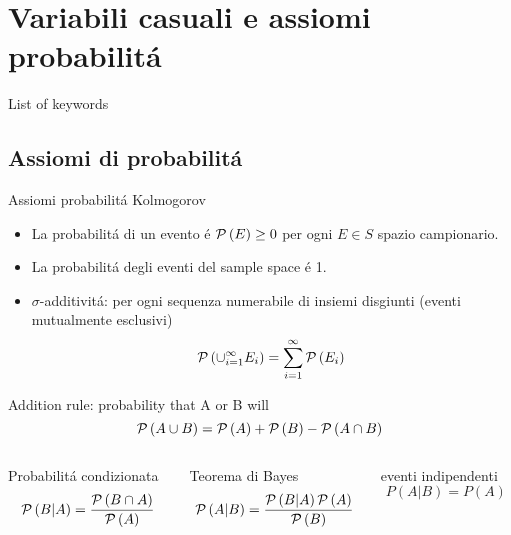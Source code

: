 \section{Variabili casuali e assiomi probabilit\'a}

\begin{frame}[allowframebreaks]{List of keywords}
\listofkeywords
\end{frame}


\subsection{Assiomi di probabilit\'a}

\begin{frame}{Assiomi probabilit\'a Kolmogorov}
\begin{itemize}
\item La probabilit\'a di un evento \'e $\operatorname{\mathcal{P}}{(E)}\geq0$ per ogni $E\in S$ spazio campionario.
\item La probabilit\'a degli eventi del sample space \'e 1.
\item $\sigma$-additivit\'a: per ogni sequenza numerabile di insiemi disgiunti (eventi mutualmente esclusivi)
\begin{equation*}
\operatorname{\mathcal{P}}{(\cup_{i=1}^{\infty}E_i)}=\sum_{i=1}^{\infty}\operatorname{\mathcal{P}}{(E_i)}
\end{equation*}
\end{itemize}
\begin{block}{Addition rule: probability that A or B will}
\begin{equation*}
\operatorname{\mathcal{P}}{(A\cup B)}=\operatorname{\mathcal{P}}{(A)}+\operatorname{\mathcal{P}}{(B)}-\operatorname{\mathcal{P}}{(A\cap B)}
\end{equation*}
\end{block}
\begin{columns}[T]
\begin{column}{0.3\textwidth}
\begin{block}{Probabilit\'a condizionata}
\[\operatorname{\mathcal{P}}{(B|A)}=\frac{\operatorname{\mathcal{P}}{(B\cap A)}}{\operatorname{\mathcal{P}}{(A)}}
\]
\end{block}
\end{column}
\begin{column}{0.4\textwidth}
\begin{block}{Teorema di Bayes}
\[\operatorname{\mathcal{P}}{(A|B)}=\frac{\operatorname{\mathcal{P}}{(B|A)}\operatorname{\mathcal{P}}{(A)}}{\operatorname{\mathcal{P}}{(B)}}\]
\end{block}
\end{column}
\begin{column}{0.25\textwidth}
\begin{block}{eventi indipendenti}
    \[P(A|B)=P(A)\]
    \end{block}
    \end{column}
\end{columns}
\end{frame}

